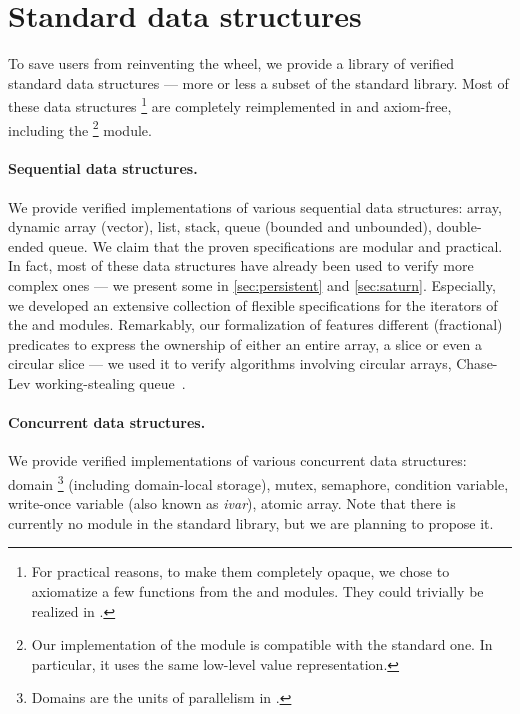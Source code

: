 \section{Standard data structures}
\label{sec:std}

To save users from reinventing the wheel, we provide a library of verified standard data structures --- more or less a subset of the \OCaml standard library.
Most of these data structures%
\footnote{
For practical reasons, to make them completely opaque, we chose to axiomatize a few functions from the  and  modules.
They could trivially be realized in \Zoo.
}
are completely reimplemented in \Zoo and axiom-free, including the %
\footnote{
Our implementation of the  module is compatible with the standard one.
In particular, it uses the same low-level value representation.
}
module.

\paragraph{Sequential data structures.}

We provide verified implementations of various sequential data structures: array, dynamic array (vector), list, stack, queue (bounded and unbounded), double-ended queue.
We claim that the proven specifications are modular and practical.
In fact, most of these data structures have already been used to verify more complex ones --- we present some in \cref{sec:persistent} and \cref{sec:saturn}.
Especially, we developed an extensive collection of flexible specifications for the iterators of the  and  modules.
Remarkably, our formalization of  features different (fractional) predicates to express the ownership of either an entire array, a slice or even a circular slice --- we used it to verify algorithms involving circular arrays, \eg Chase-Lev working-stealing queue~\citep*{DBLP:conf/spaa/ChaseL05}.

\paragraph{Concurrent data structures.}

We provide verified implementations of various concurrent data structures: domain%
\footnote{
Domains are the units of parallelism in \OCamlFive.
}
(including domain-local storage), mutex, semaphore, condition variable, write-once variable (also known as \emph{ivar}), atomic array.
Note that there is currently no  module in the \OCaml standard library, but we are planning to propose it.
